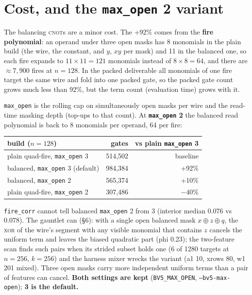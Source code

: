 \documentclass[11pt]{article}
\newcommand{\xor}{\oplus}
\newcommand{\doc}[1]{\texttt{#1}}
\begin{document}
\section{Cost, and the \doc{max\_open} 2 variant}

The balancing \textsc{cnot}s are a minor cost. The +92\% comes from the \textbf{fire
polynomial}: an operand under three open masks has 8 monomials in the plain build (the wire,
the constant, and $y$, $xy$ per mask) and 11 in the balanced one, so each fire expands to
$11{\times}11=121$ monomials instead of $8{\times}8=64$, and there are ${\approx}7{,}900$ fires
at $n=128$. In the packed deliverable all monomials of one fire target the same wire and fold
into one packed gate, so the packed gate count grows much less than 92\%, but the term count
(evaluation time) grows with it.

\doc{max\_open} is the rolling cap on simultaneously open masks per wire and the read-time
masking depth (top-ups to that count). At \textbf{\doc{max\_open} 2} the balanced read
polynomial is back to 8 monomials per operand, 64 per fire:

\begin{center}\small
\begin{tabular}{@{}lrr@{}}\toprule
build ($n=128$) & gates & vs plain \doc{max\_open} 3\\\midrule
plain quad-fire, \doc{max\_open} 3 & 514,502 & baseline\\
balanced, \doc{max\_open} 3 (default) & 984,384 & +92\%\\
balanced, \doc{max\_open} 2 & 565,374 & +10\%\\
plain quad-fire, \doc{max\_open} 2 & 307,486 & $-40\%$\\\bottomrule
\end{tabular}
\end{center}

\doc{fire\_corr} cannot tell balanced \doc{max\_open} 2 from 3 (interior median 0.076 vs
0.078). The gauntlet can (\S6): with a single open balanced mask $x\xor z\xor q$, the
\textsc{xor} of the wire's segment with any visible monomial that contains $z$ cancels the
uniform term and leaves the biased quadratic part (phi 0.23); the two-feature scan finds such
pairs when its strided subset holds one (6 of 1280 targets at $n=256$, $k=256$) and the
harness mixer wrecks the variant (a1 10, xrows 80, w1 201 mixed). Three open masks carry more
independent uniform terms than a pair of features can cancel. \textbf{Both settings are kept}
(\doc{BV5\_MAX\_OPEN}, \doc{--bv5-max-open}); \textbf{3 is the default.}
\end{document}
